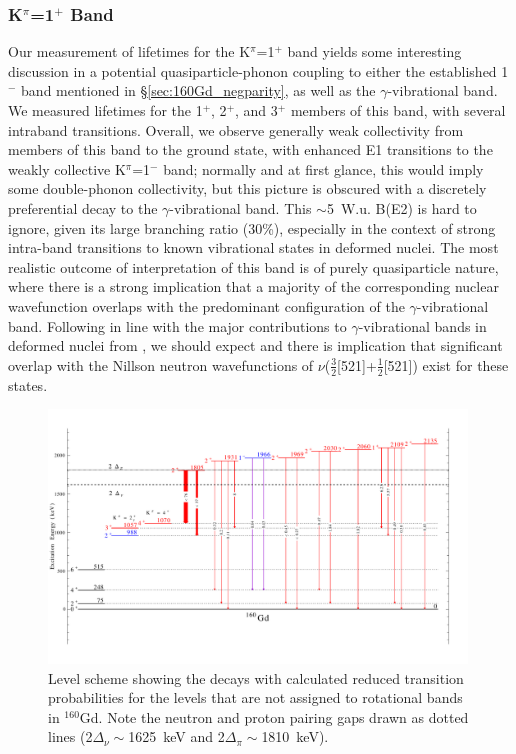 \subsubsection{K$^\pi$=1$^+$ Band}
Our measurement of lifetimes for the K$^\pi$=1$^+$ band yields some interesting discussion in a potential quasiparticle-phonon coupling to either the established 1$^-$ band mentioned in \S \ref{sec:160Gd_negparity}, as well as the $\gamma$-vibrational band. We measured lifetimes for the 1$^+$, 2$^+$, and 3$^+$ members of this band, with several intraband transitions. Overall, we observe generally weak collectivity from members of this band to the ground state, with enhanced E1 transitions to the weakly collective K$^\pi$=1$^-$ band; normally and at first glance, this would imply some double-phonon collectivity, but this picture is obscured with a discretely preferential decay to the $\gamma$-vibrational band. This $\sim$5~W.u. B(E2) is hard to ignore, given its large branching ratio (30\%), especially in the context of strong intra-band transitions to known vibrational states in deformed nuclei. The most realistic outcome of interpretation of this band is of purely quasiparticle nature, where there is a strong implication that a majority of the corresponding nuclear wavefunction overlaps with the predominant configuration of the $\gamma$-vibrational band. Following in line with the major contributions to $\gamma$-vibrational bands in deformed nuclei from \cite{Casten_text}, we should expect and there is implication that significant overlap with the Nillson neutron wavefunctions of $\nu$($\frac{3}{2}$[521]+$\frac{1}{2}$[521]) exist for these states.


\begin{center}
\begin{figure}[h!]
\includegraphics[width=0.99\textwidth]{160Gd_Kunknown.pdf}
\caption{Level scheme showing the decays with calculated reduced transition probabilities for the levels that are not assigned to rotational bands in $^{160}$Gd. Note the neutron and proton pairing gaps drawn as dotted lines (2$\Delta_\nu\sim$1625~keV and 2$\Delta_\pi\sim$1810~keV). \label{fig:160Gd_Kunknown}}
\end{figure}
\end{center}

